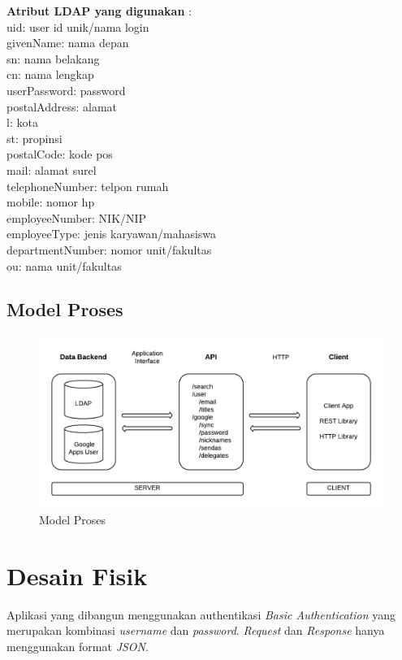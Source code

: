 \textbf{Atribut LDAP yang digunakan} \cite{biondo2001}:\\
uid: user id unik/nama login\\
givenName: nama depan\\
sn: nama belakang\\
cn: nama lengkap\\
userPassword: password\\
postalAddress: alamat\\
l: kota\\
st: propinsi\\
postalCode: kode pos\\
mail: alamat surel\\
telephoneNumber: telpon rumah\\
mobile: nomor hp\\
employeeNumber: NIK/NIP\\
employeeType: jenis karyawan/mahasiswa\\
departmentNumber: nomor unit/fakultas\\
ou: nama unit/fakultas\\

\subsection{Model Proses}

\begin{figure}
	\centering
	\includegraphics[width=1\textwidth]
		{pics/processmodel.png}
	\caption{Model Proses}
	\label{fig:model}
\end{figure}

\section{Desain Fisik}

Aplikasi yang dibangun menggunakan authentikasi \textit{Basic Authentication} yang merupakan kombinasi \textit{username} dan \textit{password}. \textit{Request} dan \textit{Response} hanya menggunakan format \textit{JSON}.

